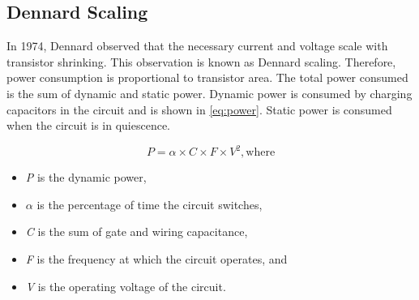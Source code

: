 \subsection{Dennard Scaling}
In 1974, Dennard observed that the necessary current and voltage scale with transistor shrinking. This observation is known as Dennard scaling. Therefore, power consumption is proportional to transistor area. The total power consumed is the sum of dynamic and static power. Dynamic power is consumed by charging capacitors in the circuit and is shown in \autoref{eq:power}. Static power is consumed when the circuit is in quiescence.

\begin{equation}
  P = \alpha \times C \times F \times V^2, \text{where}
  \label{eq:power}
\end{equation}

\begin{itemize}
  \item{\textit{P} is the dynamic power,}
  \item{$\alpha$ is the percentage of time the circuit switches,}
  \item{\textit{C} is the sum of gate and wiring capacitance,}
  \item{\textit{F} is the frequency at which the circuit operates, and}
  \item{\textit{V} is the operating voltage of the circuit.}
\end{itemize}


